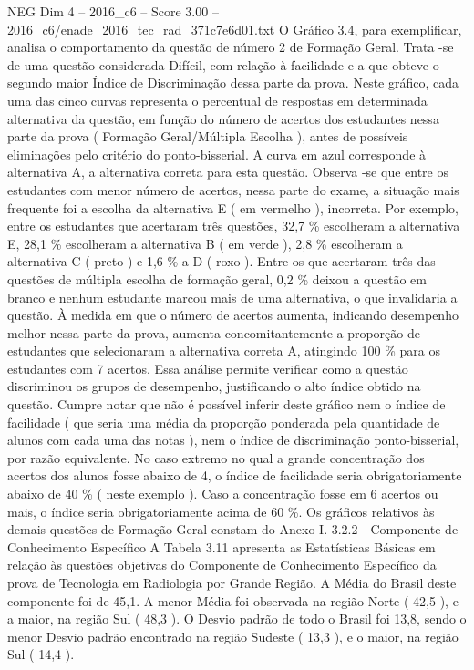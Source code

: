 \begin{textsample}{NEG Dim 4 – 2016\_c6 – Score 3.00 – 2016\_c6/enade\_2016\_tec\_rad\_371c7e6d01.txt}
O Gráfico 3.4, para exemplificar, analisa o comportamento da questão de número 2 de Formação Geral.
Trata -se de uma questão considerada Difícil, com relação à facilidade e a que obteve o segundo maior Índice de Discriminação dessa parte da prova.
Neste gráfico, cada uma das cinco curvas representa o percentual de respostas em determinada alternativa da questão, em função do número de acertos dos estudantes nessa parte da prova ( Formação Geral/Múltipla Escolha ), antes de possíveis eliminações pelo critério do ponto-bisserial.
A curva em azul corresponde à alternativa A, a alternativa correta para esta questão.
Observa -se que entre os estudantes com menor número de acertos, nessa parte do exame, a situação mais frequente foi a escolha da alternativa E ( em vermelho ), incorreta.
Por exemplo, entre os estudantes que acertaram três questões, 32,7 \% escolheram a alternativa E, 28,1 \% escolheram a alternativa B ( em verde ), 2,8 \% escolheram a alternativa C ( preto ) e 1,6 \% a D ( roxo ).
Entre os que acertaram três das questões de múltipla escolha de formação geral, 0,2 \% deixou a questão em branco e nenhum estudante marcou mais de uma alternativa, o que invalidaria a questão.
À medida em que o número de acertos aumenta, indicando desempenho melhor nessa parte da prova, aumenta concomitantemente a proporção de estudantes que selecionaram a alternativa correta A, atingindo 100 \% para os estudantes com 7 acertos.
Essa análise permite verificar como a questão discriminou os grupos de desempenho, justificando o alto índice obtido na questão.
Cumpre notar que não é possível inferir deste gráfico nem o índice de facilidade ( que seria uma média da proporção ponderada pela quantidade de alunos com cada uma das notas ), nem o índice de discriminação ponto-bisserial, por razão equivalente.
No caso extremo no qual a grande concentração dos acertos dos alunos fosse abaixo de 4, o índice de facilidade seria obrigatoriamente abaixo de 40 \% ( neste exemplo ).
Caso a concentração fosse em 6 acertos ou mais, o índice seria obrigatoriamente acima de 60 \%.
Os gráficos relativos às demais questões de Formação Geral constam do Anexo I. 3.2.2 - Componente de Conhecimento Específico A Tabela 3.11 apresenta as Estatísticas Básicas em relação às questões objetivas do Componente de Conhecimento Específico da prova de Tecnologia em Radiologia por Grande Região.
A Média do Brasil deste componente foi de 45,1.
A menor Média foi observada na região Norte ( 42,5 ), e a maior, na região Sul ( 48,3 ).
O Desvio padrão de todo o Brasil foi 13,8, sendo o menor Desvio padrão encontrado na região Sudeste ( 13,3 ), e o maior, na região Sul ( 14,4 ).

\end{textsample}
